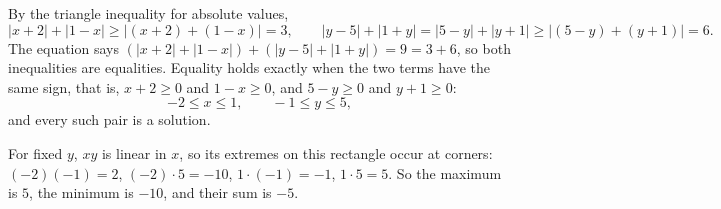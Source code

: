 By the triangle inequality for absolute values,
\[
|x+2|+|1-x|\ge|(x+2)+(1-x)|=3,\qquad |y-5|+|1+y|=|5-y|+|y+1|\ge|(5-y)+(y+1)|=6 .
\]
The equation says $\left(|x+2|+|1-x|\right)+\left(|y-5|+|1+y|\right)=9=3+6$, so both inequalities are equalities. Equality holds exactly when the two terms have the same sign, that is, $x+2\ge0$ and $1-x\ge0$, and $5-y\ge0$ and $y+1\ge0$:
\[
-2\le x\le1,\qquad -1\le y\le5 ,
\]
and every such pair is a solution.

For fixed $y$, $xy$ is linear in $x$, so its extremes on this rectangle occur at corners: $(-2)(-1)=2$, $(-2)\cdot5=-10$, $1\cdot(-1)=-1$, $1\cdot5=5$. So the maximum is $5$, the minimum is $-10$, and their sum is $\boxed{-5}$.
